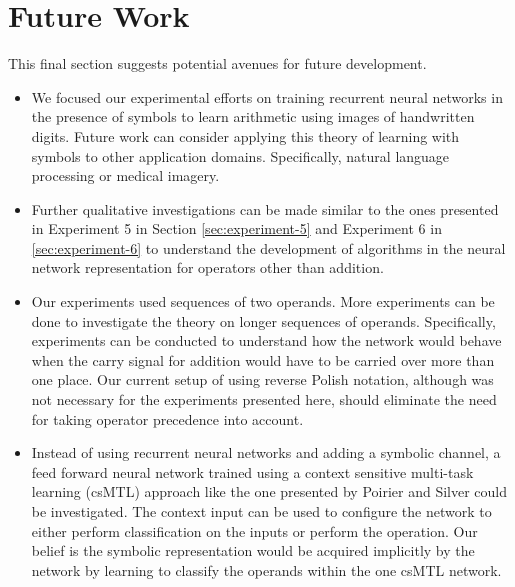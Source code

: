 \section{Future Work} \label{sec:findings-and-conclusion-future-work}

This final section suggests potential avenues for future development.

\begin{itemize}
	\item We focused our experimental efforts on training recurrent neural networks in the presence of symbols to learn arithmetic using images of handwritten digits. Future work can consider applying this theory of learning with symbols to other application domains. Specifically, natural language processing or medical imagery.
	\item Further qualitative investigations can be made similar to the ones presented in Experiment 5 in Section \ref{sec:experiment-5} and Experiment 6 in \ref{sec:experiment-6} to understand the development of algorithms in the neural network representation for operators other than addition.
	\item Our experiments used sequences of two operands. More experiments can be done to investigate the theory on longer sequences of operands. Specifically, experiments can be conducted to understand how the network would behave when the carry signal for addition would have to be carried over more than one place. Our current setup of using reverse Polish notation, although was not necessary for the experiments presented here, should eliminate the need for taking operator precedence into account.
	\item Instead of using recurrent neural networks and adding a symbolic channel, a feed forward neural network trained using a context sensitive multi-task learning (csMTL) approach like the one presented by Poirier and Silver\cite{silver2007context} could be investigated. The context input can be used to configure the network to either perform classification on the inputs or perform the operation. Our belief is the symbolic representation would be acquired implicitly by the network by learning to classify the operands within the one csMTL network.
\end{itemize}